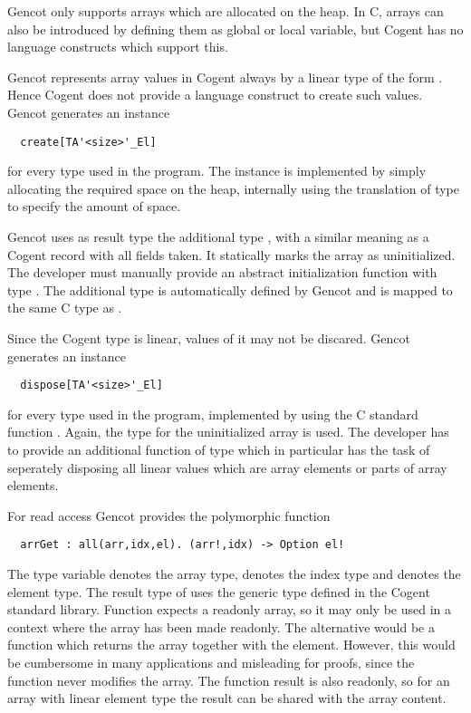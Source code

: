 Gencot only supports arrays which are allocated on the heap. In C, arrays can also be introduced by defining
them as global or local variable, but Cogent has no language constructs which support this.

Gencot represents array values in Cogent always by a linear type of the form .
Hence Cogent does not provide a language construct to create such values. Gencot generates an instance
\begin{verbatim}
  create[TA'<size>'_El]
\end{verbatim}
for every type  used in the program. The instance is implemented by simply allocating the
required space on the heap, internally using the translation of type  to specify
the amount of space. 

Gencot uses as result type the additional type , with a similar meaning as a Cogent
record with all fields taken. It statically marks the array as uninitialized. The developer must manually provide
an abstract initialization function with type . The additional type
is automatically defined by Gencot and is mapped to the same C type as .

Since the Cogent type  is linear, values of it may not be discared. Gencot generates an instance 
\begin{verbatim}
  dispose[TA'<size>'_El]
\end{verbatim}
for every type  used in the program, implemented by using the C standard function .
Again, the type for the uninitialized array is used. The developer has to provide an additional function
of type  which in particular has the task of seperately disposing 
all linear values which are array elements or parts of array elements.

For read access Gencot provides the polymorphic function
\begin{verbatim}
  arrGet : all(arr,idx,el). (arr!,idx) -> Option el!
\end{verbatim}
The type variable  denotes the array type,  denotes the index type and
 denotes the element type. The result type of  uses the generic type  defined in
the Cogent standard library.  Function  expects a readonly array, so it may only be used in a context where
the array has been made readonly. The alternative would be a function which returns the array together with the element.
However, this would be cumbersome in many applications and misleading for proofs, since the function never modifies
the array. The function result is also readonly, so for an array with linear element type the result can be shared 
with the array content.

